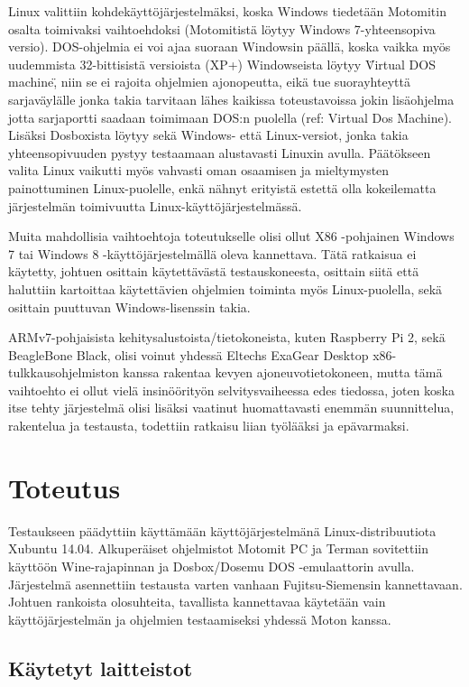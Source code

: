 \documentclass[11pt,a4paper,oneside,article]{memoir}
\begin{document}
Linux valittiin kohdekäyttöjärjestelmäksi, koska Windows tiedetään Motomitin osalta toimivaksi vaihtoehdoksi (Motomitistä löytyy Windows 7-yhteensopiva versio). DOS-ohjelmia ei voi ajaa suoraan Windowsin päällä, koska vaikka myös uudemmista 32-bittisistä versioista (XP+) Windowseista löytyy \"Virtual DOS machine\", niin se ei rajoita ohjelmien ajonopeutta, eikä tue suorayhteyttä sarjaväylälle jonka takia tarvitaan lähes kaikissa toteustavoissa jokin lisäohjelma jotta sarjaportti saadaan toimimaan DOS:n puolella (ref: Virtual Dos Machine). Lisäksi Dosboxista löytyy sekä Windows- että Linux-versiot, jonka takia yhteensopivuuden pystyy testaamaan alustavasti Linuxin avulla. Päätökseen valita Linux vaikutti myös vahvasti oman osaamisen ja mieltymysten painottuminen Linux-puolelle, enkä nähnyt erityistä estettä olla kokeilematta järjestelmän toimivuutta Linux-käyttöjärjestelmässä.

Muita mahdollisia vaihtoehtoja toteutukselle olisi ollut X86 -pohjainen Windows 7 tai Windows 8 -käyttöjärjestelmällä oleva kannettava. Tätä ratkaisua ei käytetty, johtuen osittain käytettävästä testauskoneesta, osittain siitä että haluttiin kartoittaa käytettävien ohjelmien toiminta myös Linux-puolella, sekä osittain puuttuvan Windows-lisenssin takia.

ARMv7-pohjaisista kehitysalustoista/tietokoneista, kuten Raspberry Pi 2, sekä BeagleBone Black, olisi voinut yhdessä Eltechs ExaGear Desktop x86-tulkkausohjelmiston kanssa rakentaa kevyen ajoneuvotietokoneen, mutta tämä vaihtoehto ei ollut vielä insinöörityön selvitysvaiheessa edes tiedossa, joten koska itse tehty järjestelmä olisi lisäksi vaatinut huomattavasti enemmän suunnittelua, rakentelua ja testausta, todettiin ratkaisu liian työlääksi ja epävarmaksi.

\newpage
\chapter{Toteutus}

Testaukseen päädyttiin käyttämään käyttöjärjestelmänä Linux-distribuutiota Xubuntu 14.04. Alkuperäiset ohjelmistot Motomit PC ja Terman sovitettiin käyttöön Wine-rajapinnan ja Dosbox/Dosemu DOS -emulaattorin avulla. Järjestelmä asennettiin testausta varten vanhaan Fujitsu-Siemensin kannettavaan. Johtuen rankoista olosuhteita, tavallista kannettavaa käytetään vain käyttöjärjestelmän ja ohjelmien testaamiseksi yhdessä Moton kanssa.

\section{Käytetyt laitteistot}
\end{document}
